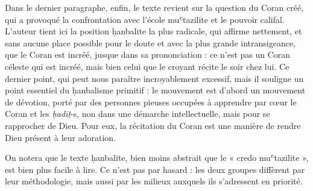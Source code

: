 Dans le dernier paragraphe, enfin, le texte revient sur la question du
Coran créé, qui a provoqué la confrontation avec l'école muʿtazilite et
le pouvoir califal. L'auteur tient ici la position ḥanbalite la plus
radicale, qui affirme nettement, et sans aucune place possible pour le
doute et avec la plus grande intransigeance, que le Coran est incréé,
jusque dans sa prononciation : ce n'est pas un Coran céleste qui est
incréé, mais bien celui que le croyant récite le soir chez lui. Ce
dernier point, qui peut nous paraître incroyablement excessif, mais il
souligne un point essentiel du ḥanbalisme primitif : le mouvement est
d'abord un mouvement de dévotion, porté par des personnes pieuses
occupées à apprendre par cœur le
Coran et les \emph{ḥadīṯ}-s, non dans une démarche intellectuelle, mais
pour se rapprocher de Dieu. Pour eux, la récitation du Coran est une
manière de rendre Dieu présent à leur adoration.

On notera que le texte ḥanbalite, bien moins abstrait que le « credo
muʿtazilite », est bien plus facile à lire. Ce n'est pas par hasard :
les deux groupes diffèrent par leur méthodologie, mais aussi par les
milieux auxquels ils s'adressent en priorité.

